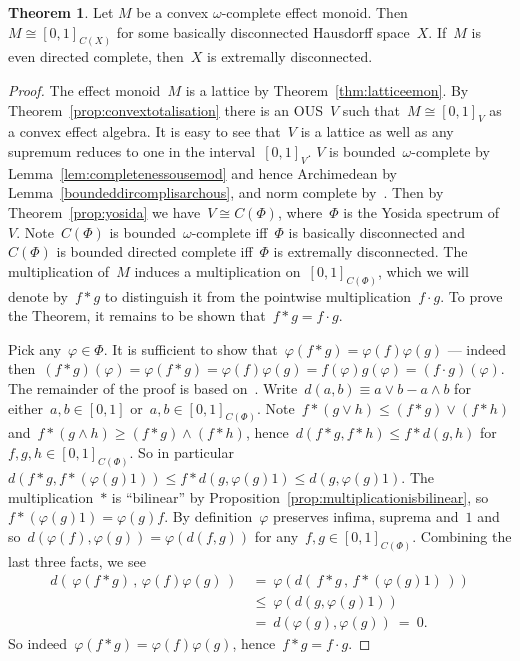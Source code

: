 \documentclass[10pt,conference]{IEEEtran}
\newcounter{counter}
\theoremstyle{definition}
\newtheorem{theorem}[counter]{Theorem}
\begin{document}
\begin{theorem}\label{thm:convexextremallydisconnected}
    Let $M$ be a convex $\omega$-complete effect monoid.
    Then $M \cong [0,1]_{C(X)}$ for some basically
        disconnected Hausdorff space~$X$.
    If~$M$ is even directed complete, then~$X$ is extremally disconnected.
\end{theorem}
\begin{proof}
    The effect monoid~$M$ is a lattice by Theorem~\ref{thm:latticeemon}.
    By Theorem~\ref{prop:convextotalisation}
            there is an OUS~$V$
            such that~$M \cong [0,1]_V$ as a convex effect algebra.
        It is easy to see that~$V$ is a lattice as well
            as any supremum reduces to one in the interval~$[0,1]_V$.
    $V$ is bounded~$\omega$-complete
        by Lemma~\ref{lem:completenessousemod} and hence Archimedean by Lemma~\ref{boundeddircomplisarchous},
        and norm complete by~\cite[Lemma 1.2]{wright1972measures}.
Then by Theorem~\ref{prop:yosida}
    we have~$V \cong C(\Phi)$,
        where~$\Phi$ is the Yosida spectrum of~$V$.
    Note~$C(\Phi)$ is bounded~$\omega$-complete
     iff~$\Phi$ is basically disconnected
     and~$C(\Phi)$ is bounded directed complete
        iff~$\Phi$ is extremally disconnected.
The multiplication of~$M$
    induces a multiplication on~$[0,1]_{C(\Phi)}$,
    which we will denote by~$f * g$ to distinguish it
    from the pointwise multiplication~$f \cdot g$.
To prove the Theorem,
    it remains to be shown that~$f * g = f \cdot g$.

Pick any~$\varphi \in \Phi$.
It is sufficient to show that~$\varphi(f * g) = \varphi(f) \varphi(g)$
    --- indeed then~$(f * g)(\varphi) = \varphi( f * g) = \varphi(f) \varphi(g)
                = f(\varphi) g(\varphi) = (f\cdot g)(\varphi)$.
The remainder of the proof is based on~\cite[Lemma~5.26]{riesz}.
Write~$d(a,b) \equiv a\vee b - a\wedge b$
        for either~$a,b \in [0,1]$ or~$a,b \in [0,1]_{C(\Phi)}$.
    Note~$f * (g \vee h) \leq (f*g) \vee (f*h)$
    and~$f * (g \wedge h) \geq (f*g) \wedge (f*h)$,
    hence~$d(f * g, f*h) \leq f * d(g,h)$ for~$f,g,h \in [0,1]_{C(\Phi)}$.
So in particular~$d(f * g, f * (\varphi(g) 1)) \leq f * d(g, \varphi(g) 1)
                    \leq d(g, \varphi(g)1)$.
The multiplication~$*$ is ``bilinear''
     by Proposition~\ref{prop:multiplicationisbilinear},
        so~$f * (\varphi(g) 1) = \varphi(g) f$.
By definition~$\varphi$ preserves infima, suprema and~$1$
    and so~$d(\varphi(f), \varphi(g)) = \varphi(d(f,g))$
        for any~$f,g \in [0,1]_{C(\Phi)}$.
Combining the last three facts, we see
\begin{align*}
        d(\,\varphi(f*g)\,,\, \varphi(f)\varphi(g)\,)
                & \ =\  \varphi(d(\, f*g\,,\, f * (\varphi(g) 1)\,)) \\
               & \ \leq\  \varphi(d(g, \varphi(g)1)) \\
               & \ =\  d(\varphi(g), \varphi(g)) \ = \ 0.
\end{align*}
    So indeed~$\varphi(f*g) = \varphi(f)\varphi(g)$,
        hence~$f*g = f\cdot g$.
\end{proof}
\end{document}
